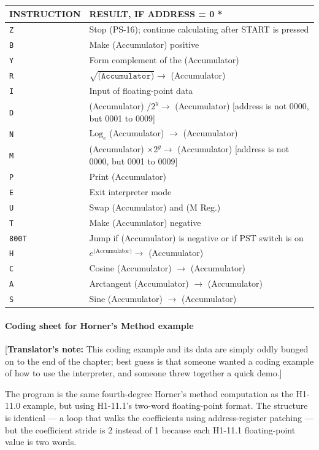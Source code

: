 \begin{tabularx}{\textwidth}{lX}
	\textbf{INSTRUCTION} & \textbf{RESULT, IF ADDRESS = 0 *} \\
	\midrule
	\texttt{Z} & Stop (PS-16); continue calculating after \textsf{START} is pressed \\
	\texttt{B} & Make (Accumulator) positive \\
	\texttt{Y} & Form complement of the (Accumulator) \\
	\texttt{R} & $\sqrt{\texttt{(Accumulator)}} \rightarrow$ (Accumulator) \\
	\texttt{I} & Input of floating-point data \\
	\texttt{D} & (Accumulator) $/ 2^y \rightarrow$ (Accumulator) [address is not 0000, but 0001 to 0009] \\
	\texttt{N} & $\text{Log}_e$ (Accumulator) $\rightarrow$ (Accumulator) \\
	\texttt{M} & (Accumulator) $\times 2^y \rightarrow$ (Accumulator) [address is not 0000, but 0001 to 0009] \\
	\texttt{P} & Print (Accumulator) \\
	\texttt{E} & Exit interpreter mode \\
	\texttt{U} & Swap (Accumulator) and (M Reg.) \\
	\texttt{T} & Make (Accumulator) negative \\
	\texttt{800T} & Jump if (Accumulator) is negative or if \textsf{PST} switch is on \\
	\texttt{H} & $e^{\text{(Accumulator)}} \rightarrow$ (Accumulator) \\
	\texttt{C} & Cosine (Accumulator) $\rightarrow$ (Accumulator) \\
	\texttt{A} & Arctangent (Accumulator) $\rightarrow$ (Accumulator) \\
	\texttt{S} & Sine (Accumulator) $\rightarrow$ (Accumulator) \\
\end{tabularx}

\paragraph{Coding sheet for Horner's Method example}
[\textbf{Translator's note:} This coding example and its data are simply oddly bunged on to the end of the chapter; best guess is that someone wanted a coding example of how to use the interpreter, and someone threw together a quick demo.]

The program is the same fourth-degree Horner's method computation as the H1-11.0 example, but using H1-11.1's two-word floating-point format. The structure is identical --- a loop that walks the coefficients using address-register patching --- but the coefficient stride is 2 instead of 1 because each H1-11.1 floating-point value is two words.

